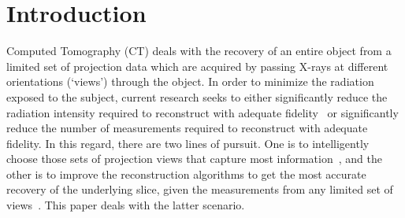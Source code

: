 \documentclass[journal]{IEEEtran}
\begin{document}
%
\IEEEpeerreviewmaketitle



\section{Introduction}
\label{sec:intro}
Computed Tomography (CT) deals with the recovery of an entire object from a limited set of projection data which are acquired by passing X-rays at different orientations (`views') through the object. In order to minimize the radiation exposed to the subject, current research seeks to either significantly reduce the radiation intensity required to reconstruct with adequate fidelity~\cite{gopal2019low} or significantly reduce the number of measurements required to reconstruct with adequate fidelity. In this regard, there are two lines of pursuit. One is to intelligently choose those sets of projection views that capture most information~\cite{King2018,Anthony2018,barkan17,fischer16,andrei14}, and the other is to improve the reconstruction algorithms to get the most accurate recovery of the underlying slice, given the measurements from any limited set of views~\cite{yang2018,geyer2015,kilic2011}. This paper deals with the latter scenario.
\end{document}

